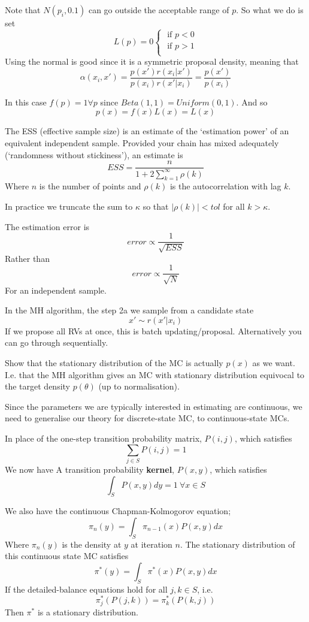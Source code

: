 \documentclass{X:/Documents/Coding/Latex/myassignment}
\begin{document}
Note that $N(p_i,0.1)$ can go outside the acceptable range of $p$. So what we do is set
\[L(p) = 0 \begin{cases}
    \text{ if } p<0\\
    \text{ if } p>1\\    
\end{cases}\]
Using the normal is good since it is a symmetric proposal density, meaning that 
\[\alpha(x_i,x') = \frac{p(x') r(x_i|x')}{p(x_i) r(x'|x_i)} = \frac{p(x')}{p(x_i)}\]

In this case $f(p) =1 \forall p$ since $Beta(1,1) = Uniform(0,1)$.
And so
\[p(x) = f(x)L(x) = L(x)\]


The ESS (effective sample size) is an estimate of the `estimation power' of an equivalent independent sample. Provided your chain has mixed adequately (`randomness without stickiness'), an estimate is
\[ESS = \frac{n}{1 + 2\sum_{k=1}^\infty \rho(k)}\]
Where $n$ is the number of points and $\rho(k)$ is the autocorrelation with lag $k$.

In practice we truncate the sum to $\kappa$ so that $|\rho(k)| < tol$ for all $k > \kappa$.

The estimation error is \[error \propto \frac{1}{\sqrt{ESS}}\]
Rather than 
\[error \propto \frac{1}{\sqrt{N}}\]
For an independent sample.





In the MH algorithm, the step 2a we sample from a candidate state
\[x' \sim r(x'|x_i)\]
If we propose all RVs at once, this is batch updating/proposal.
Alternatively you can go through sequentially. 


Show that the stationary distribution of the MC is actually $p(x)$ as we want. I.e. that the MH algorithm gives an MC with stationary distribution equivocal to the target density $p(\theta)$ (up to normalisation).

Since the parameters we are typically interested in estimating are continuous, we need to generalise our theory for discrete-state MC, to continuous-state MCs.

In place of the one-step transition probability matrix, $P(i,j)$, which satisfies
\[\sum_{j\in S} P(i,j) = 1\]
We now have 
A transition probability \textbf{kernel}, $P(x,y)$, which satisfies
\[\int_S P(x,y) dy = 1 \ \forall x \in S\]

We also have the continuous Chapman-Kolmogorov equation;
\[\pi_n(y) = \int_S \pi_{n-1} (x) P(x,y) dx\]
Where $\pi_n(y)$ is the density at $y$ at iteration $n$.
The stationary distribution of this continuous state MC satisfies
\[\pi^*(y) = \int_S \pi^*(x) P(x,y) dx\]
If the detailed-balance equations hold for all $j,k \in S$, i.e. 
\[\pi^*_j(P(j,k)) = \pi_k^*(P(k,j))\]
Then $\pi^*$ is a stationary distribution.
\end{document}
